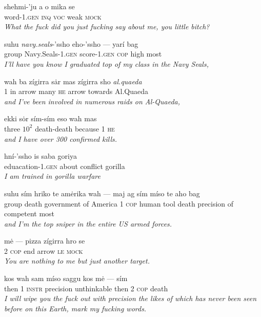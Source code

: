 \documentclass{article}[10pt]
\begin{document}
\begin{exe}
\ex
\gll shehmi-'ju a o mika se\\
word-\textsc{1.gen} \textsc{inq} \textsc{voc} weak \textsc{mock}\\
\trans \emph{What the fuck did you just fucking say about me, you little bitch?}

\ex
\gll suhu \emph{navy.seals}-'ssho eho-'ssho --- yar\'{i} bag\\
group Navy.Seals-\textsc{1.gen} score-\textsc{1.gen} \textsc{cop} high most\\
\trans \emph{I'll have you know I graduated top of my class in the Navy Seals,}

\ex
\gll wah ba z\'{i}girra s\.{a}r mas z\'{i}girra sho \emph{al.quaeda}\\
1 in arrow many \textsc{he} arrow towards Al.Quaeda\\
\trans \emph{and I've been involved in numerous raids on Al-Quaeda,}

\ex
\gll ekki s\.{o}r s\'{i}m-s\'{i}m eso wah mas\\
three $10^2$ death-death because 1 \textsc{he}\\
\trans \emph{and I have over 300 confirmed kills.}

\ex
\gll hn\'{i}-'ssho is saba goriya\\
eduacation-\textsc{1.gen} about conflict gorilla\\
\trans \emph{I am trained in gorilla warfare}

\ex
\gll suhu s\'{i}m hriko te am\.{e}rika wah --- maj ag s\'{i}m m\'{i}so te aho bag\\
group death government of America 1 \textsc{cop} human tool death precision of competent most\\
\trans \emph{and I'm the top sniper in the entire US armed forces.}

\ex
\gll m\.{e} --- pizza z\'{i}girra hro se\\
2 \textsc{cop} end arrow \textsc{le} \textsc{mock}\\
\trans \emph{You are nothing to me but just another target.}

\ex
\gll kos wah sam m\'{i}so saggu kos m\.{e} --- s\'{i}m\\
then 1 \textsc{instr} precision unthinkable then 2 \textsc{cop} death\\
\trans \emph{I will wipe you the fuck out with precision the likes of which has never been seen before on this Earth, mark my fucking words.}


\end{exe}
\end{document}
